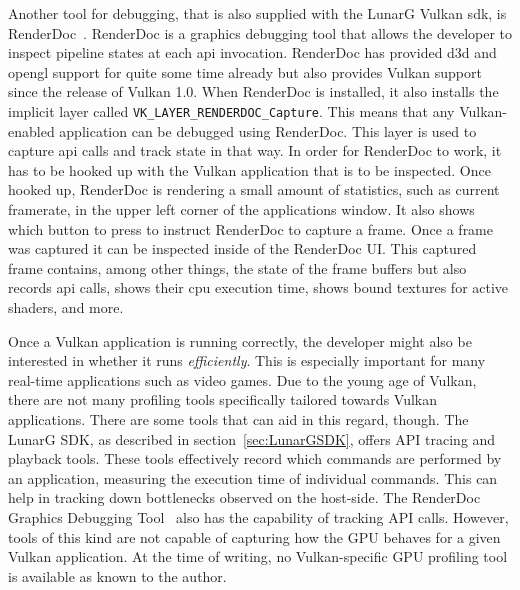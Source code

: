     Another tool for debugging, that is also supplied with the LunarG Vulkan \gls{sdk}, is RenderDoc~\cite{renderdoc}.
    RenderDoc is a graphics debugging tool that allows the developer to inspect pipeline states at each \gls{api} invocation.
    RenderDoc has provided \gls{d3d} and \gls{opengl} support for quite some time already but also provides Vulkan support since the release of Vulkan 1.0.
    When RenderDoc is installed, it also installs the implicit layer called \lstinline{VK_LAYER_RENDERDOC_Capture}.
    This means that any Vulkan-enabled application can be debugged using RenderDoc.
    This layer is used to capture \gls{api} calls and track state in that way.
    In order for RenderDoc to work, it has to be hooked up with the Vulkan application that is to be inspected.
    Once hooked up, RenderDoc is rendering a small amount of statistics, such as current framerate, in the upper left corner of the applications window.
    It also shows which button to press to instruct RenderDoc to capture a frame.
    Once a frame was captured it can be inspected inside of the RenderDoc UI.
    This captured frame contains, among other things, the state of the frame buffers but also records \gls{api} calls, shows their \gls{cpu} execution time, shows bound textures for active shaders, and more.

    Once a Vulkan application is running correctly, the developer might also be interested in whether it runs \textit{efficiently}.
    This is especially important for many real-time applications such as video games.
    Due to the young age of Vulkan, there are not many profiling tools specifically tailored towards Vulkan applications.
    There are some tools that can aid in this regard, though.
    The LunarG SDK, as described in section~\ref{sec:LunarGSDK}, offers API tracing and playback tools.
    These tools effectively record which commands are performed by an application, measuring the execution time of individual commands.
    This can help in tracking down bottlenecks observed on the host-side.
    The RenderDoc Graphics Debugging Tool~\cite{renderdoc} also has the capability of tracking API calls.
    However, tools of this kind are not capable of capturing how the GPU behaves for a given Vulkan application.
    At the time of writing, no Vulkan-specific GPU profiling tool is available as known to the author.


